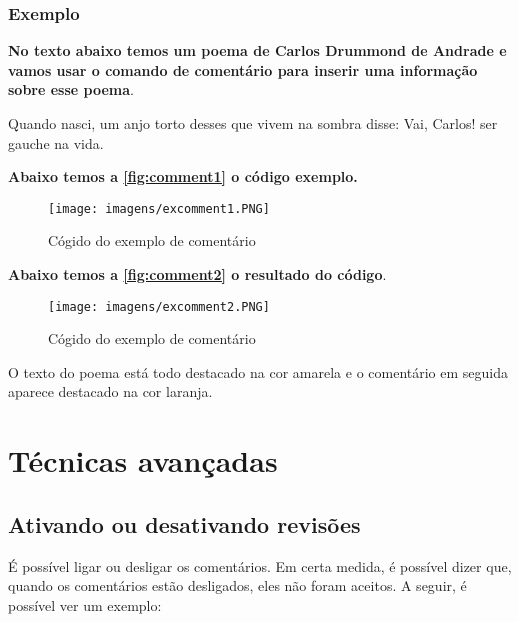 \documentclass[12pt,openright,oneside,a4paper,sumario=tradicional,brazil]{abntex2}
\begin{document}
\subsection{Exemplo}

\textbf{No texto abaixo temos um poema de Carlos Drummond de Andrade e vamos usar o comando de comentário para inserir uma informação sobre esse poema}.\\

\begin{center}
    \justifying
    Quando nasci, um anjo torto
desses que vivem na sombra
disse: Vai, Carlos! ser gauche na vida.
\end{center}

\noindent \textbf{Abaixo temos a \autoref{fig:comment1} o código exemplo.}

\begin{figure}[htp]
\caption{Cógido do exemplo de comentário}
        \centering
        \texttt{[image: imagens/excomment1.PNG]}
\label{fig:comment1}
\end{figure}

\noindent \textbf{Abaixo temos a \autoref{fig:comment2} o resultado do código}.

\begin{figure}[htp]
\caption{Cógido do exemplo de comentário}
        \centering
        \texttt{[image: imagens/excomment2.PNG]}
\label{fig:comment2}
\end{figure}

\noindent O texto do poema está todo destacado na cor amarela e o comentário em seguida aparece destacado na cor laranja.

\chapter{Técnicas avançadas}

\section{Ativando ou desativando revisões}
É possível ligar ou desligar os comentários. Em certa medida, é possível dizer que, quando os comentários estão desligados, eles não foram aceitos. A seguir, é possível ver um exemplo:\\
\end{document}
